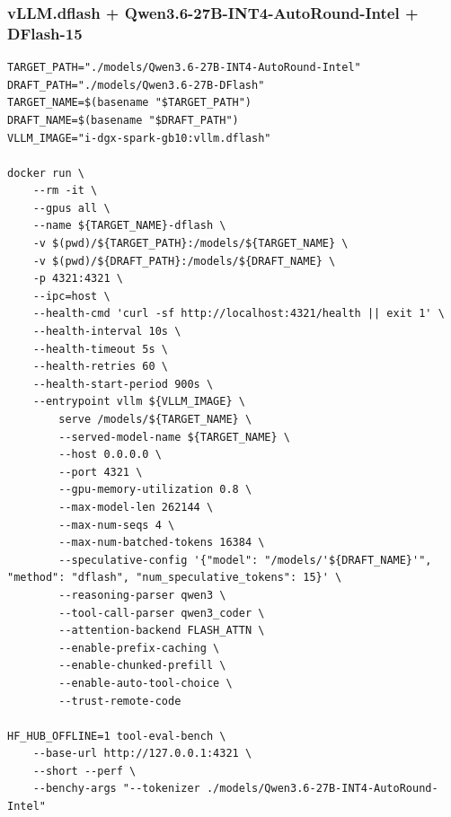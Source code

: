\documentclass{article}
\begin{document}
\subsubsection{vLLM.dflash + Qwen3.6-27B-INT4-AutoRound-Intel + DFlash-15}
\begin{lstlisting}
TARGET_PATH="./models/Qwen3.6-27B-INT4-AutoRound-Intel"
DRAFT_PATH="./models/Qwen3.6-27B-DFlash"
TARGET_NAME=$(basename "$TARGET_PATH")
DRAFT_NAME=$(basename "$DRAFT_PATH")
VLLM_IMAGE="i-dgx-spark-gb10:vllm.dflash"

docker run \
    --rm -it \
    --gpus all \
    --name ${TARGET_NAME}-dflash \
    -v $(pwd)/${TARGET_PATH}:/models/${TARGET_NAME} \
    -v $(pwd)/${DRAFT_PATH}:/models/${DRAFT_NAME} \
    -p 4321:4321 \
    --ipc=host \
    --health-cmd 'curl -sf http://localhost:4321/health || exit 1' \
    --health-interval 10s \
    --health-timeout 5s \
    --health-retries 60 \
    --health-start-period 900s \
    --entrypoint vllm ${VLLM_IMAGE} \
        serve /models/${TARGET_NAME} \
        --served-model-name ${TARGET_NAME} \
        --host 0.0.0.0 \
        --port 4321 \
        --gpu-memory-utilization 0.8 \
        --max-model-len 262144 \
        --max-num-seqs 4 \
        --max-num-batched-tokens 16384 \
        --speculative-config '{"model": "/models/'${DRAFT_NAME}'", "method": "dflash", "num_speculative_tokens": 15}' \
        --reasoning-parser qwen3 \
        --tool-call-parser qwen3_coder \
        --attention-backend FLASH_ATTN \
        --enable-prefix-caching \
        --enable-chunked-prefill \
        --enable-auto-tool-choice \
        --trust-remote-code

HF_HUB_OFFLINE=1 tool-eval-bench \
    --base-url http://127.0.0.1:4321 \
    --short --perf \
    --benchy-args "--tokenizer ./models/Qwen3.6-27B-INT4-AutoRound-Intel"
\end{lstlisting}
\end{document}
